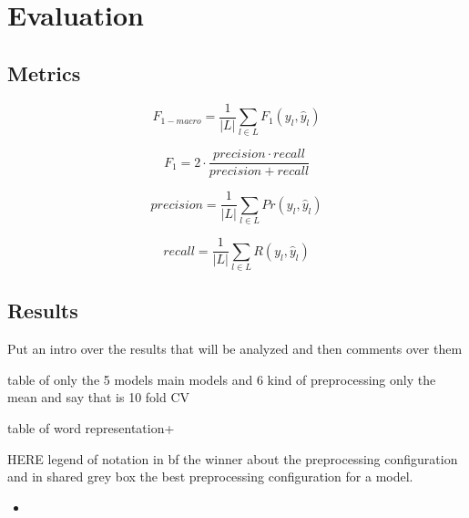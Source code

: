 \section{Evaluation} \label{sec:evaluation}



\subsection{Metrics}

\begin{equation}
F_{1-macro} = \frac{1}{|L|} \displaystyle\sum_{l\in L} F_1(y_l, \hat{y}_l)
\end{equation}

\begin{equation}
F_1 = 2 \cdot \frac{precision \cdot recall }{precision + recall}
\end{equation}

\begin{equation}
precision = \frac{1}{|L|} \displaystyle\sum_{l\in L} Pr(y_l, \hat{y}_l)
\end{equation}

\begin{equation}
recall = \frac{1}{|L|} \displaystyle\sum_{l\in L} R(y_l, \hat{y}_l)
\end{equation}


\subsection{Results}

Put an intro over the results that will be analyzed and then comments over them

table of only the 5 models main models and 6 kind of preprocessing
only the mean and say that is 10 fold CV

table of word representation+


HERE legend of notation
in bf the winner about the preprocessing configuration and in shared grey box the best preprocessing configuration for a model.

\begin{itemize}
\item 
\end{itemize}


